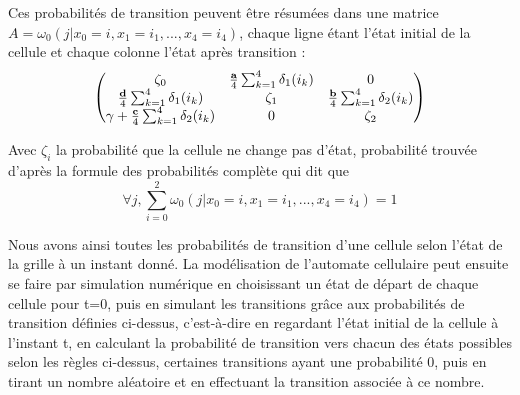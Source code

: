 Ces probabilités de transition peuvent être résumées dans une matrice $A=\omega_0(j|x_0=i, x_1=i_1, ..., x_4=i_4)$, chaque ligne étant l'état initial de la cellule et chaque colonne l'état après transition : 
$$\begin{pmatrix}
\zeta_0 & \frac{\textbf{a}}{4}\sum_{k=1}^{4}\delta_{1}(i_k)\end{equation} & 0 \\
\frac{\textbf{d}}{4}\sum_{k=1}^{4}\delta_{1}(i_k) & \zeta_1 & \frac{\textbf{b}}{4}\sum_{k=1}^{4}\delta_{2}(i_k) \\
\gamma + \frac{\textbf{c}}{4}\sum_{k=1}^{4}\delta_{2}(i_k) & 0 & \zeta_2
\end{pmatrix}$$

Avec $\zeta_i$ la probabilité que la cellule ne change pas d'état, probabilité trouvée d'après la formule des probabilités complète qui dit que \begin{equation}
\forall j, \sum_{i=0}^2\omega_0(j|x_0=i, x_1=i_1, ..., x_4=i_4)=1\end{equation}

Nous avons ainsi toutes les probabilités de transition d'une cellule selon l'état de la grille à un instant donné. La modélisation de l'automate cellulaire peut ensuite se faire par simulation numérique en choisissant un état de départ de chaque cellule pour t=0, puis en simulant les transitions grâce aux probabilités de transition définies ci-dessus, c'est-à-dire en regardant l'état initial de la cellule à l'instant t, en calculant la probabilité de transition vers chacun des états possibles selon les règles ci-dessus, certaines transitions ayant une probabilité 0, puis en tirant un nombre aléatoire et en effectuant la transition associée à ce nombre. 
